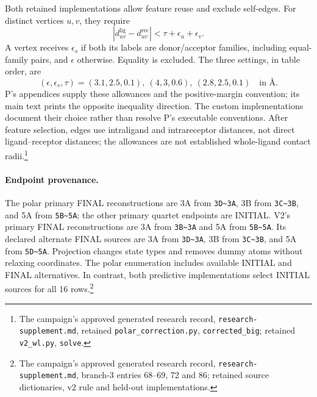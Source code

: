 \documentclass{article}
\newcommand{\rr}[1]{\footnote{The campaign's approved generated research record, \texttt{research-supplement.md}, #1.}}
\begin{document}
Both retained implementations allow feature reuse and exclude self-edges. For distinct vertices \(u,v\), they require
\[
 |d^{\mathrm{lig}}_{uv}-d^{\mathrm{rec}}_{uv}|
 <\tau+\epsilon_u+\epsilon_v.
\]
A vertex receives \(\epsilon_s\) if both its labels are donor/acceptor families, including equal-family pairs, and \(\epsilon\) otherwise. Equality is excluded. The three settings, in table order, are
\[
 (\epsilon,\epsilon_s,\tau)
 =(3.1,2.5,0.1),\ (4,3,0.6),\ (2.8,2.5,0.1)
 \quad\text{in \AA}.
\]
P's appendices supply these allowances and the positive-margin convention; its main text prints the opposite inequality direction. The custom implementations document their choice rather than resolve P's executable conventions. After feature selection, edges use intraligand and intrareceptor distances, not direct ligand--receptor distances; the allowances are not established whole-ligand contact radii.\cite{P}\rr{retained \texttt{polar\_correction.py}, \texttt{corrected\_big}; retained \texttt{v2\_wl.py}, \texttt{solve}}

\paragraph{Endpoint provenance.}
The polar primary FINAL reconstructions are 3A from \texttt{3D\textasciitilde3A}, 3B from \texttt{3C\textasciitilde3B}, and 5A from \texttt{5B\textasciitilde5A}; the other primary quartet endpoints are INITIAL. V2's primary FINAL reconstructions are 3A from \texttt{3B\textasciitilde3A} and 5A from \texttt{5B\textasciitilde5A}. Its declared alternate FINAL sources are 3A from \texttt{3D\textasciitilde3A}, 3B from \texttt{3C\textasciitilde3B}, and 5A from \texttt{5D\textasciitilde5A}. Projection changes state types and removes dummy atoms without relaxing coordinates. The polar enumeration includes available INITIAL and FINAL alternatives. In contrast, both predictive implementations select INITIAL sources for all 16 rows.\rr{branch-3 entries 68--69, 72 and 86; retained source dictionaries, v2 rule and held-out implementations}
\end{document}
